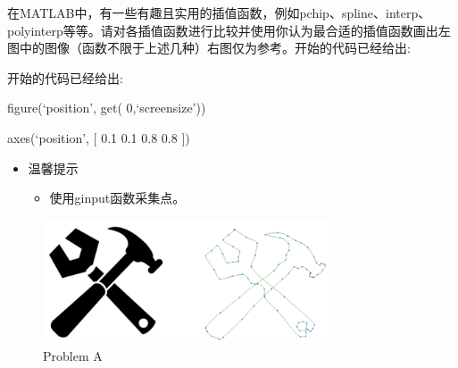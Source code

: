 \documentclass[12pt,a4paper]{article}
\begin{document}
\begin{spacing}{1.4}
{}
\end{spacing}
\begin{ACEEproblem}{1.4}{\xiaosihao}{\youyuan}
\begin{spacing}{1.4}
在MATLAB中，有一些有趣且实用的插值函数，例如pchip、spline、interp、polyinterp等等。请对各插值函数进行比较并使用你认为最合适的插值函数画出左图中的图像（函数不限于上述几种）右图仅为参考。开始的代码已经给出:\par
开始的代码已经给出:\par
figure(`position', get( 0,`screensize'))\par
axes(`position', [ 0.1 0.1 0.8 0.8 ])\par
\end{spacing}

\begin{itemize}
	\item 温馨提示
	\begin{itemize}
		\item 使用ginput函数采集点。
	\end{itemize}
\end{itemize}

\begin{figure}[H]
\small
\centering
\includegraphics[width=8.5cm]{A.png}
\caption{Problem A} 
\end{figure} 
\end{ACEEproblem}
\end{document}
